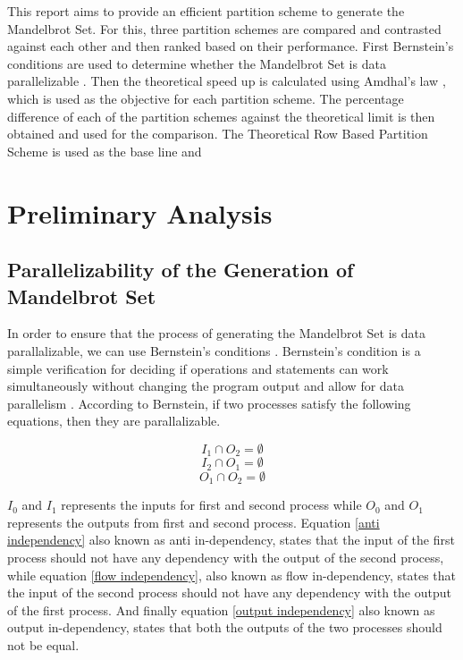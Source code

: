 \documentclass[conference]{IEEEtran}
\begin{document}
	This report aims to provide an efficient partition scheme to generate the Mandelbrot Set. For this, three partition schemes are compared and contrasted against each other and then ranked based on their performance. 
	First Bernstein's conditions are used to determine whether the Mandelbrot Set is data parallelizable \cite{bernstein1996analysis}. Then the theoretical speed up is calculated using Amdhal's law \cite{}, which is used as the objective for each partition scheme. The percentage difference of each of the partition schemes against the theoretical limit is then obtained and used for the comparison. 
	The Theoretical  Row Based Partition Scheme is used as the base line and 
	
	
	\section{Preliminary Analysis}
	
			\subsection{Parallelizability of the Generation of Mandelbrot Set}
			
			In order to ensure that the process of generating the Mandelbrot Set is data parallalizable, we can use Bernstein’s conditions \cite{bernstein1996analysis}. Bernstein's condition is a simple verification for deciding if operations and statements can work simultaneously without changing the program output and allow for data parallelism \cite{Feautrier2011}. According to Bernstein, if two processes satisfy the following equations, then they are parallalizable.
			
			\begin{equation}
				I_1 \cap O_2 = \emptyset\label{anti independency}
			\end{equation}
			\begin{equation}
				I_2 \cap O_1 = \emptyset \label{flow independency}
			\end{equation}
			\begin{equation}
				O_1 \cap O_2 = \emptyset \label{output independency}
			\end{equation}
			
			$I_0$ and $I_1$ represents the inputs for first and second process while  $O_0$ and $O_1$ represents the outputs from first and second process. Equation \ref{anti independency} also known as anti in-dependency, states that the input of the first process should not have any dependency with the output of the second process, while equation \ref{flow independency}, also known as flow in-dependency, states that the input of the second process should not have any dependency with the output of the first process. And finally equation \ref{output independency} also known as output in-dependency, states that both the outputs of the two processes should not be equal.
			
\end{document}

